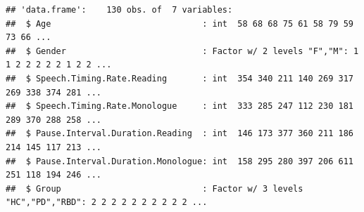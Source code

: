 \documentclass[
  english,
  doc,floatsintext]{apa6}
\begin{document}
\begin{table}[!htbp] \centering \renewcommand*{\arraystretch}{1.1}\caption{Summary of the Data Set used in this Analysis}\label{tab:summarize-data-frame}
\end{table}

\begin{verbatim}
## 'data.frame':    130 obs. of  7 variables:
##  $ Age                              : int  58 68 68 75 61 58 79 59 73 66 ...
##  $ Gender                           : Factor w/ 2 levels "F","M": 1 1 2 2 2 2 2 1 2 2 ...
##  $ Speech.Timing.Rate.Reading       : int  354 340 211 140 269 317 269 338 374 281 ...
##  $ Speech.Timing.Rate.Monologue     : int  333 285 247 112 230 181 289 370 288 258 ...
##  $ Pause.Interval.Duration.Reading  : int  146 173 377 360 211 186 214 145 117 213 ...
##  $ Pause.Interval.Duration.Monologue: int  158 295 280 397 206 611 251 118 194 246 ...
##  $ Group                            : Factor w/ 3 levels "HC","PD","RBD": 2 2 2 2 2 2 2 2 2 2 ...
\end{verbatim}

\clearpage
\end{document}
